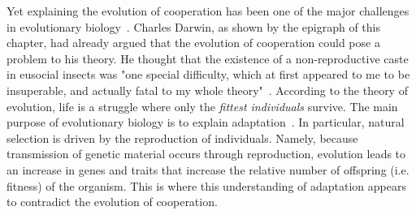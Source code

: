     Yet explaining the evolution of cooperation has been one of the major challenges in evolutionary biology~\parencite{Hamilton1964, Dugatkin2002, West2011a}. Charles Darwin, as shown by the epigraph of this chapter, had already argued that the evolution of cooperation could pose a problem to his theory. He thought that the existence of a non-reproductive caste in eusocial insects was "one special difficulty, which at first appeared to me to be insuperable, and actually fatal to my whole theory"~\parencite{Darwin1859}. According to the theory of evolution, life is a struggle where only the \emph{fittest individuals} survive. The main purpose of evolutionary biology is to explain adaptation~\parencite{West2011a}. In particular, natural selection is driven by the reproduction of individuals. Namely, because transmission of genetic material occurs through reproduction, evolution leads to an increase in genes and traits that increase the relative number of offspring (i.e. fitness) of the organism. This is where this understanding of adaptation appears to contradict the evolution of cooperation.




